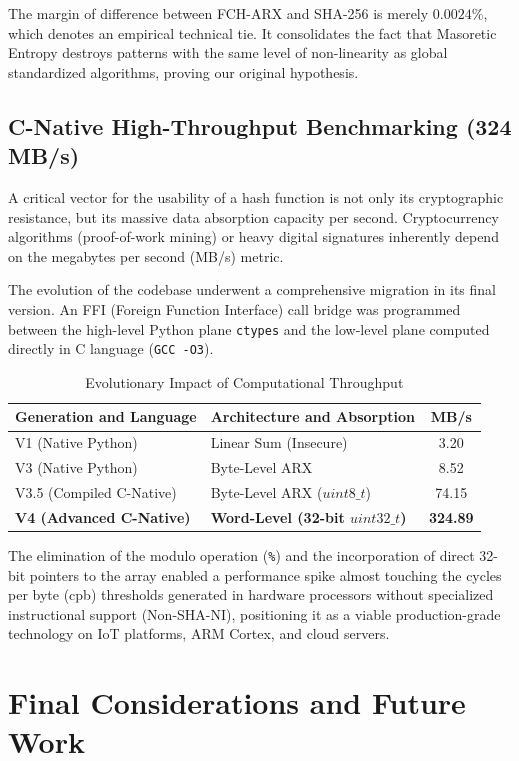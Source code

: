 \documentclass[10pt,journal,compsoc]{IEEEtran}
\begin{document}
The margin of difference between FCH-ARX and SHA-256 is merely $0.0024\%$, which denotes an empirical technical tie. It consolidates the fact that Masoretic Entropy destroys patterns with the same level of non-linearity as global standardized algorithms, proving our original hypothesis.

\subsection{C-Native High-Throughput Benchmarking (324 MB/s)}
A critical vector for the usability of a hash function is not only its cryptographic resistance, but its massive data absorption capacity per second. Cryptocurrency algorithms (proof-of-work mining) or heavy digital signatures inherently depend on the megabytes per second (MB/s) metric.

The evolution of the codebase underwent a comprehensive migration in its final version. An FFI (Foreign Function Interface) call bridge was programmed between the high-level Python plane \texttt{ctypes} and the low-level plane computed directly in C language (\texttt{GCC -O3}).

\begin{table}[h!]
\centering
\caption{Evolutionary Impact of Computational Throughput}
\label{tab:performance}
\begin{tabular}{@{}llc@{}}
\toprule
\textbf{Generation and Language} & \textbf{Architecture and Absorption} & \textbf{MB/s} \\ \midrule
V1 (Native Python) & Linear Sum (Insecure) & 3.20 \\
V3 (Native Python) & Byte-Level ARX & 8.52 \\
V3.5 (Compiled C-Native) & Byte-Level ARX ($uint8\_t$) & 74.15 \\
\textbf{V4 (Advanced C-Native)} & \textbf{Word-Level (32-bit $uint32\_t$)} & \textbf{324.89} \\ \bottomrule
\end{tabular}
\end{table}

The elimination of the modulo operation (\texttt{\%}) and the incorporation of direct 32-bit pointers to the array enabled a performance spike almost touching the cycles per byte (cpb) thresholds generated in hardware processors without specialized instructional support (Non-SHA-NI), positioning it as a viable production-grade technology on IoT platforms, ARM Cortex, and cloud servers.

\section{Final Considerations and Future Work}
\end{document}
